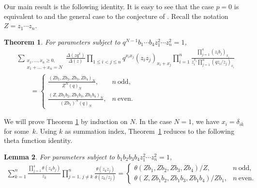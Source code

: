 \documentclass[pdftex]{sigma}
\numberwithin{equation}{section}
\newtheorem{Theorem}{Theorem}[section]
\newtheorem{Lemma}[Theorem]{Lemma}
\begin{document}
Our main result is the following identity. It is easy to see that the case $p=0$ is equivalent to \cite[Theorem~1.2]{gr} and the general case to the conjecture of \cite[p.~953]{sp}. Recall the notation $Z=z_1\dotsm z_n$.

\begin{Theorem}\label{grt}
For parameters subject to $q^{N-1}b_1\dotsm b_4z_1^2\dotsm z_n^2=1$,
\begin{gather}\sum_{\substack{x_1,\dots,x_n\geq 0,\\x_1+\dots+x_n=N}}
\frac{\Delta(zq^x)}{\Delta(z)}\prod\limits_{1\leq i<j\leq n}q^{x_ix_j}(z_iz_j)_{x_i+x_j}\prod\limits_{i=1}^n
\frac{\prod\limits_{j=1}^4(z_ib_j)_{x_i}}{z_i^{x_i}\prod\limits_{j=1}^n(qz_i/z_j)_{x_i}}\nonumber\\
\qquad{} =\begin{cases}
\displaystyle\frac{(Zb_1,Zb_2,Zb_3,Zb_4)_N}{Z^N(q)_N}, & n~\text{odd},\\[4mm]
\displaystyle\frac{(Z,Zb_1b_2,Zb_1b_3,Zb_1b_4)_N}{(Zb_1)^N(q)_N}, & n~\text{even}.
\end{cases}\label{gri}
\end{gather}
\end{Theorem}

We will prove Theorem \ref{grt} by induction on $N$. In the case $N=1$, we have $x_i=\delta_{ik}$ for some~$k$. Using $k$ as summation index,
Theorem~\ref{grt} reduces to the following theta function identity.

\begin{Lemma}
For parameters subject to $b_1b_2b_3b_4z_1^2\dotsm z_n^2=1$,
\begin{gather}\label{ib}\sum_{k=1}^n\frac{\prod\limits_{j=1}^4\theta(z_kb_j)}{z_k}\prod\limits_{j=1,\,j\neq k}^n\frac{\theta(z_kz_j)}{\theta(z_k/z_j)}
=\begin{cases}
\theta(Zb_1,Zb_2,Zb_3,Zb_4)/Z, & n~\text{odd},\\
\theta(Z,Zb_1b_2,Zb_1b_3,Zb_1b_4)/Zb_1, & n~\text{even}.
 \end{cases} \end{gather}
\end{Lemma}
\end{document}
